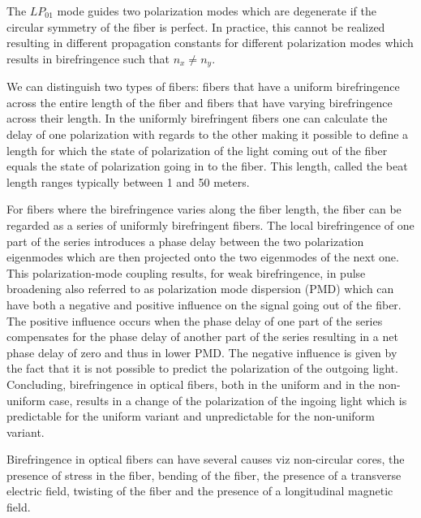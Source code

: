 The $LP_{01}$ mode guides two polarization modes which are degenerate if the circular symmetry of the fiber is perfect. In practice, this cannot be realized resulting in different propagation constants for different polarization modes which results in birefringence such that $n_x \not= n_y$.

We can distinguish two types of fibers: fibers that have a uniform birefringence across the entire length of the fiber and fibers that have varying birefringence across their length.  In the uniformly birefringent fibers one can calculate the delay of one polarization with regards to the other making it possible to define a length for which the state of polarization of the light coming out of the fiber equals the state of polarization going in to the fiber. This length, called the beat length ranges typically between 1 and 50 meters. 

For fibers where the birefringence varies along the fiber length, the fiber can be regarded as a series of uniformly birefringent fibers. The local birefringence of one part of the series introduces a phase delay between the two polarization eigenmodes which are then projected onto the two eigenmodes of the next one. This polarization-mode coupling results, for weak birefringence, in pulse broadening  also referred to as polarization mode dispersion (PMD) which can have both a negative and positive influence on the signal going out of the fiber. The positive influence occurs when the phase delay of one part of the series compensates for the phase delay of another part of the series resulting in a net phase delay of zero and thus in lower PMD. The negative influence is given by the fact  that it is not possible to predict the polarization of the outgoing light. Concluding, birefringence in optical fibers, both in the uniform and in the non-uniform case, results in a change of the polarization of the ingoing light which is predictable for the uniform variant and unpredictable for the non-uniform variant. 

 Birefringence in optical fibers can have several causes viz non-circular cores, the presence of stress in the fiber, bending of the fiber, the presence of a transverse electric field, twisting of the fiber and the presence of a longitudinal magnetic field. 

